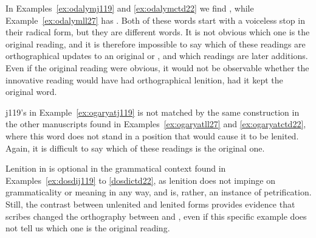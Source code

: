 In Examples~\ref{ex:odalymj119} and \ref{ex:odalymctd22} we find , while Example~\ref{ex:odalymll27} has . Both of these words start with a voiceless stop in their radical form, but they are different words. It is not obvious which one is the original reading, and it is therefore impossible to say which of these readings are orthographical updates to an original  or , and which readings are later additions. Even if the original reading were obvious, it would not be observable whether the innovative reading would have had orthographical lenition, had it kept the original word.

\begin{mwl}
\end{mwl}
\Gls{j119}'s  in Example~\ref{ex:ogaryatj119} is not matched by the same construction in the other manuscripts found in Examples~\ref{ex:ogaryatll27} and \ref{ex:ogaryatctd22}, where this word does not stand in a position that would cause it to be lenited. Again, it is difficult to say which of these readings is the original one.

\begin{mwl}
\end{mwl}

Lenition in  is optional in the grammatical context found in Examples~\ref{ex:dosdij119} to \ref{dosdictd22}, as lenition does not impinge on grammaticality or meaning in any way, and is, rather, an instance of petrification. Still, the contrast between unlenited and lenited forms provides evidence that scribes changed the orthography between  and , even if this specific example does not tell us which one is the original reading.

